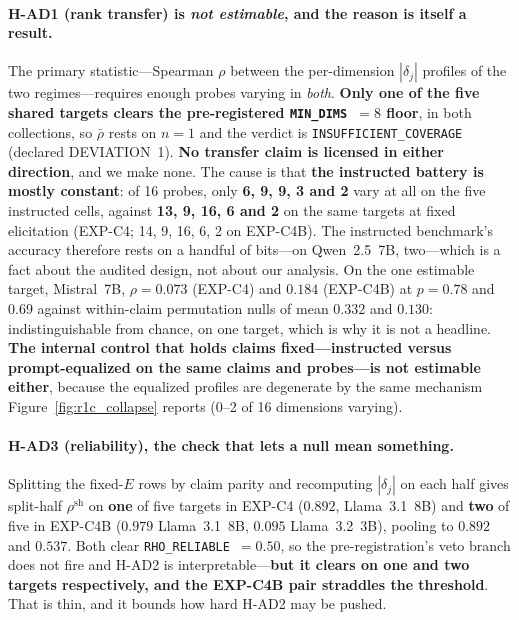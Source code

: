\paragraph{H-AD1 (rank transfer) is \emph{not estimable}, and the reason is itself a result.} The primary statistic---Spearman $\rho$ between the per-dimension $|\delta_j|$ profiles of the two regimes---requires enough probes varying in \emph{both}. \textbf{Only one of the five shared targets clears the pre-registered \texttt{MIN\_DIMS}~$=8$ floor}, in both collections, so $\bar\rho$ rests on $n\!=\!1$ and the verdict is \texttt{INSUFFICIENT\_COVERAGE} (declared DEVIATION~1). \textbf{No transfer claim is licensed in either direction}, and we make none. The cause is that \textbf{the instructed battery is mostly constant}: of 16 probes, only \textbf{6, 9, 9, 3 and 2} vary at all on the five instructed cells, against \textbf{13, 9, 16, 6 and 2} on the same targets at fixed elicitation (EXP-C4; 14, 9, 16, 6, 2 on EXP-C4B). The instructed benchmark's accuracy therefore rests on a handful of bits---on Qwen~2.5~7B, two---which is a fact about the audited design, not about our analysis. On the one estimable target, Mistral~7B, $\rho\!=\!0.073$ (EXP-C4) and $0.184$ (EXP-C4B) at $p\!=\!0.78$ and $0.69$ against within-claim permutation nulls of mean $0.332$ and $0.130$: indistinguishable from chance, on one target, which is why it is not a headline. \textbf{The internal control that holds claims fixed---instructed versus prompt-equalized on the same claims and probes---is not estimable either}, because the equalized profiles are degenerate by the same mechanism Figure~\ref{fig:r1c_collapse} reports (0--2 of 16 dimensions varying).

\paragraph{H-AD3 (reliability), the check that lets a null mean something.} Splitting the fixed-$E$ rows by claim parity and recomputing $|\delta_j|$ on each half gives split-half $\rho^{\mathrm{sh}}$ on \textbf{one} of five targets in EXP-C4 ($0.892$, Llama~3.1~8B) and \textbf{two} of five in EXP-C4B ($0.979$ Llama~3.1~8B, $0.095$ Llama~3.2~3B), pooling to $0.892$ and $0.537$. Both clear \texttt{RHO\_RELIABLE}~$=0.50$, so the pre-registration's veto branch does not fire and H-AD2 is interpretable---\textbf{but it clears on one and two targets respectively, and the EXP-C4B pair straddles the threshold}. That is thin, and it bounds how hard H-AD2 may be pushed.


